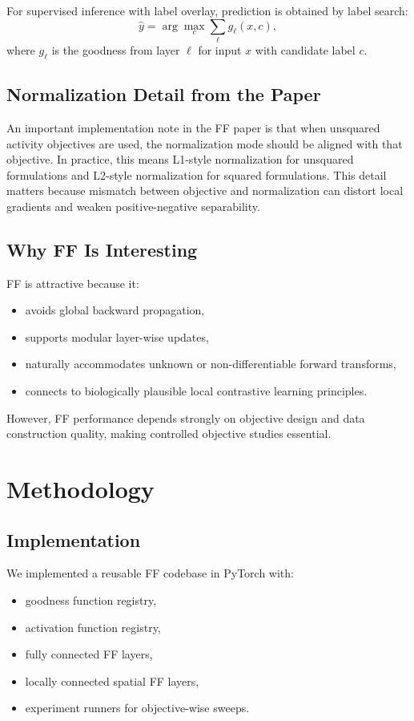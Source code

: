 \documentclass[sigconf]{acmart}
\begin{document}
For supervised inference with label overlay, prediction is obtained by label search:
\begin{equation}
\hat{y} = \arg\max_c \sum_\ell g_\ell(x, c),
\end{equation}
where $g_\ell$ is the goodness from layer $\ell$ for input $x$ with candidate label $c$.

\subsection{Normalization Detail from the Paper}
An important implementation note in the FF paper is that when unsquared activity objectives are used, the normalization mode should be aligned with that objective. In practice, this means L1-style normalization for unsquared formulations and L2-style normalization for squared formulations. This detail matters because mismatch between objective and normalization can distort local gradients and weaken positive-negative separability.

\subsection{Why FF Is Interesting}
FF is attractive because it:
\begin{itemize}
  \item avoids global backward propagation,
  \item supports modular layer-wise updates,
  \item naturally accommodates unknown or non-differentiable forward transforms,
  \item connects to biologically plausible local contrastive learning principles.
\end{itemize}

However, FF performance depends strongly on objective design and data construction quality, making controlled objective studies essential.

\section{Methodology}
\subsection{Implementation}
We implemented a reusable FF codebase in PyTorch with:
\begin{itemize}
  \item goodness function registry,
  \item activation function registry,
  \item fully connected FF layers,
  \item locally connected spatial FF layers,
  \item experiment runners for objective-wise sweeps.
\end{itemize}
\end{document}
